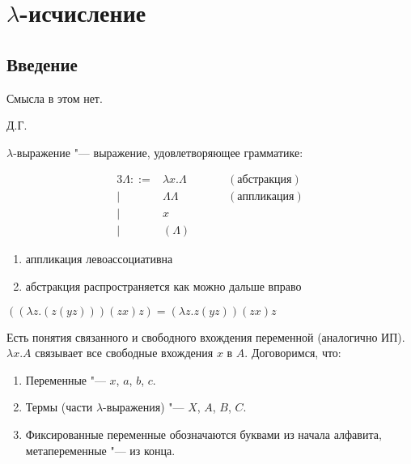 \section{\texorpdfstring{$\lambda$-исчисление}{Lambda calculus}}

\subsection{\texorpdfstring{Введение}{Introduction}}
\epigraph{Смысла в этом нет.}{Д.Г.}

\begin{definition}
    $\lambda$-выражение "--- выражение, удовлетворяющее грамматике:
    \begin{bnf}
    \begin{alignat*}{3}
        \Lambda ::= & \lambda{}x.\Lambda{} \qquad && (абстракция) \\
                  | & \Lambda{}\Lambda{}          && (аппликация) \\
                  | & x                                           \\
                  | & \left(\Lambda\right)
    \end{alignat*}
    \end{bnf}
    \begin{enumerate}[label=(\asbuk*)]
        \item аппликация левоассоциативна
        \item абстракция распространяется как можно дальше вправо
    \end{enumerate}
\end{definition}

\begin{example}
    $((\lambda{} z.(z (y z))) (z x) z) = (\lambda{} z.z (y z)) (z x) z$
\end{example}

Есть понятия связанного и свободного вхождения переменной (аналогично ИП).
$\lambda{}x.A$ связывает все свободные вхождения $x$ в $A$.
Договоримся, что:
\begin{enumerate}[label=(\asbuk*)]
    \item Переменные "--- $x$, $a$, $b$, $c$.
    \item Термы (части $\lambda$-выражения) "--- $X$, $A$, $B$, $C$.
    \item Фиксированные переменные обозначаются буквами из начала алфавита, метапеременные "--- из конца.
\end{enumerate}

